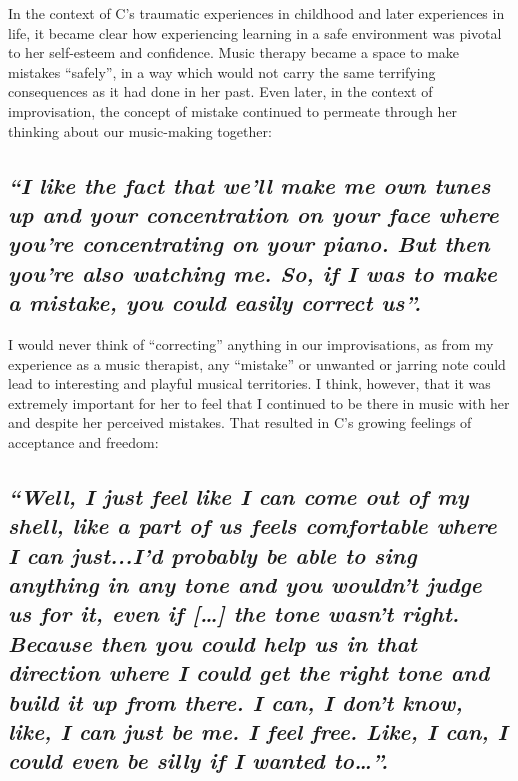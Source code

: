 \documentclass[authordate, empirical]{jote-new-article}
\begin{document}
	In the context of C's traumatic experiences in childhood and later experiences in life, it became clear how experiencing learning in a safe environment was pivotal to her self-esteem and confidence. Music therapy became a space to make mistakes “safely”, in a way which would not carry the same terrifying consequences as it had done in her past. Even later, in the context of improvisation, the concept of mistake continued to permeate through her thinking about our music-making together:







	\subsection{\emph{“I like the fact that we'll make me own tunes up and your concentration on your face where you're concentrating on your piano. But then you're also watching me. So, if I was to make a mistake, you could easily correct us”.}}







	I would never think of “correcting” anything in our improvisations, as from my experience as a music therapist, any “mistake” or unwanted or jarring note could lead to interesting and playful musical territories. I think, however, that it was extremely important for her to feel that I continued to be there in music with her\emph{ }and despite\emph{ }her perceived mistakes. That resulted in C's growing feelings of acceptance and freedom:\emph{ }







	\subsection{\emph{“Well, I just feel like I can come out of my shell, like a part of us feels comfortable where I can just...I'd probably be able to sing anything in any tone and you wouldn't judge us for it, even if […] the tone wasn't right. Because then you could help us in that direction where I could get the right tone and build it up from there. I can, I don't know, like, I can just be me. I feel free. Like, I can, I could even be silly if I wanted to…”. }}
\end{document}
